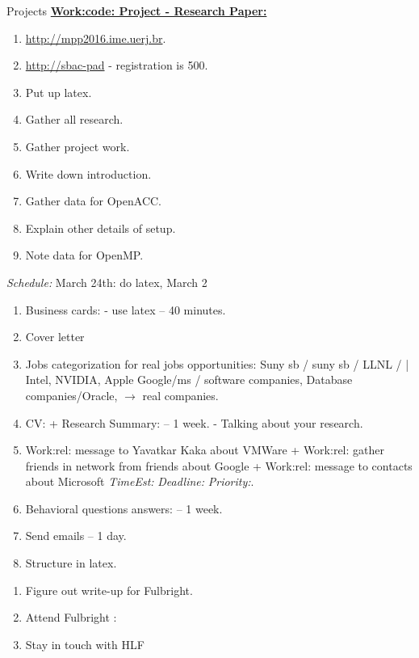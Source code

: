 \documentclass[serif, mathserif, final]{beamer}
\newcommand{\te}[1]{\textit{TimeEst:}\textit{#1}}
\newcommand{\dl}[1]{\textit{Deadline:}\textit{#1}}
\newcommand{\pr}[1]{\textit{Priority:}\textit{#1}}
\begin{document}
\begin{frame}
\begin{columns}
\begin{column}{0.5\textwidth}
\begin{block}{Projects}
{\underline{\bf Work:code: Project - Research Paper:}}
\begin{enumerate}
\tiny \item \tiny \url{http://mpp2016.ime.uerj.br}. 
\item \tiny \url{http://sbac-pad}  - registration is  500.
\item \tiny Put up latex.  
\item \tiny Gather all research. 
\item \tiny Gather project work. 
\item \tiny Write down introduction.
\item \tiny Gather data for OpenACC. 
\item \tiny Explain other details of setup. 
\item \tiny Note data for OpenMP. 
\end{enumerate} 
\textit{Schedule:} March 24th: do latex, March 2 \\
\begin{enumerate} 
\tiny \item \tiny Business cards:  - use latex  -- 40 minutes. 
\item \tiny Cover letter 
\item \tiny Jobs categorization for real jobs opportunities: 
Suny sb / suny sb / LLNL /  |  Intel, NVIDIA, Apple  Google/ms /
software companies, Database companies/Oracle, $\rightarrow$ real
companies. 
\item \tiny CV: + Research Summary:  -- 1 week.  - Talking about your research.
\item \tiny Work:rel: message to Yavatkar Kaka about VMWare +
  Work:rel: gather friends in network from friends about Google + Work:rel: message to contacts about Microsoft \te{} \dl{} \pr{}. 
\item \tiny Behavioral questions answers:    -- 1 week. 
\item \tiny Send emails – 1 day. 
\item \tiny Structure in latex. 
\end{enumerate}
\begin{enumerate} 
\tiny \item \tiny Figure out write-up for Fulbright. 
\item \tiny Attend Fulbright : 
\item \tiny Stay in touch with HLF 

\end{enumerate}
\end{block}
\end{column}
\end{columns}
\end{frame}
\end{document}

